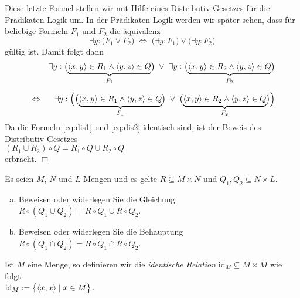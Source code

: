 Diese letzte Formel stellen wir mit Hilfe eines Distributiv-Gesetzes f\"{u}r die
Pr\"{a}dikaten-Logik um.  In der Pr\"{a}dikaten-Logik werden wir sp\"{a}ter sehen, dass f\"{u}r beliebige
Formeln $F_1$ und $F_2$ die \"{a}quivalenz
\[ \exists y: \bigl(F_1 \vee F_2\bigr) \;\Leftrightarrow\; \bigl(\exists y: F_1\bigr) \vee \bigl(\exists y: F_2\bigr) \]
g\"{u}ltig ist.  Damit folgt dann
\begin{eqnarray}
\nonumber
 & & \exists y: \bigl(\underbrace{\pair(x,y) \in R_1 \wedge \pair(y,z) \in Q}_{F_1}\bigr) \;\vee\; 
     \exists y: \bigl(\underbrace{\pair(x,y) \in R_2 \wedge \pair(y,z) \in Q}_{F_2}\bigr) \\[0.2cm]
  \label{eq:dis2}
 & \Leftrightarrow &
     \exists y: \Bigl(\bigl(\underbrace{\pair(x,y) \in R_1 \wedge \pair(y,z) \in Q}_{F_1}\bigr) \;\vee\; 
                \bigl(\underbrace{\pair(x,y) \in R_2 \wedge \pair(y,z) \in Q}_{F_2}\bigr)\Bigr) 
\end{eqnarray}
Da die Formeln \ref{eq:dis1} und \ref{eq:dis2} identisch sind, ist der Beweis des
Distributiv-Gesetzes 
\\[0.2cm]
\hspace*{1.3cm}
 $(R_1 \cup R_2) \circ Q = R_1 \circ Q \cup R_2 \circ Q$
\\[0.2cm]
erbracht. \hspace*{\fill} $\Box$
\vspace{0.2cm}
\pagebreak

\exercise
Es seien $M$, $N$ und $L$ Mengen und es gelte $R \subseteq M \times N$ und $Q_1,Q_2 \subseteq N \times L$. 
\begin{enumerate}[(a)]
\item Beweisen oder widerlegen Sie die Gleichung
      \\[0.2cm]
      \hspace*{1.3cm}  $R \circ (Q_1 \cup Q_2) = R \circ Q_1 \cup R \circ Q_2$.
\item Beweisen oder widerlegen Sie die Behauptung 
      \\[0.2cm]
      \hspace*{1.3cm}
      $R \circ (Q_1 \cap Q_2) = R \circ Q_1 \cap R \circ Q_2$. \eox
\end{enumerate}


\begin{Definition}
  Ist $M$ eine Menge, so definieren wir die \emph{identische Relation} $\mathrm{id}_M \subseteq M \times M$
  wie folgt: \\[0.2cm]
  \hspace*{1.3cm} $\mathrm{id}_M := \bigl\{ \pair(x,x) \mid x \in M \bigr\}$.  \eox
\end{Definition}

